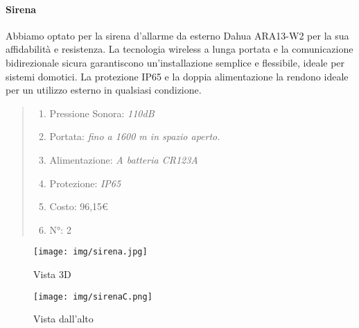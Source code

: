 \documentclass[italian, 12pt, a4paper]{article}
\begin{document}
\paragraph{Sirena}
Abbiamo optato per la sirena d'allarme da esterno Dahua ARA13-W2 per la sua affidabilità e resistenza. La tecnologia wireless a lunga portata e la comunicazione bidirezionale sicura garantiscono un'installazione semplice e flessibile, ideale per sistemi domotici. La protezione IP65 e la doppia alimentazione la rendono ideale per un utilizzo esterno in qualsiasi condizione.
\begin{quote}
    \begin{enumerate}
        \item Pressione Sonora: \emph{110dB}
        \item Portata: \emph{fino a 1600 m in spazio aperto.}
        \item Alimentazione: \emph{A batteria CR123A}
        \item Protezione: \emph{IP65}
        \item Costo: 96,15€
        \item N°: 2
    \end{enumerate}
\end{quote}
\begin{figure}[h]
    \centering
    \begin{minipage}{0.45\textwidth}
        \centering
        \texttt{[image: img/sirena.jpg]}
        \caption{Vista 3D}
    \end{minipage} \hfill
    \begin{minipage}{0.45\textwidth}
        \centering
        \texttt{[image: img/sirenaC.png]}
        \caption{Vista dall'alto}
    \end{minipage}
\end{figure}
\clearpage
\end{document}
